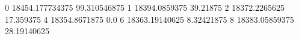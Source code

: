 0 18454.177734375 99.310546875
1 18394.0859375 39.21875
2 18372.2265625 17.359375
4 18354.8671875 0.0
6 18363.19140625 8.32421875
8 18383.05859375 28.19140625
